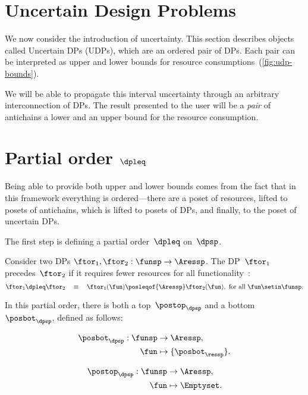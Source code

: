 \section{Uncertain Design Problems}
\label{sec:UDP}

We now consider the introduction of uncertainty.
This section describes
objects called Uncertain DPs (UDPs), which are an ordered pair of
DPs.
Each pair can be interpreted as upper and lower bounds for resource
consumptions~(\cref{fig:udp-bounds}).


We will be able to propagate this interval uncertainty through an
arbitrary interconnection of DPs.
The result presented to the user
will be a \emph{pair} of antichains \textemdash{} a lower and an upper
bound for the resource consumption.

\section{Partial order $\dpleq$}

Being able to provide both upper and lower bounds comes from the fact
that in this framework everything is ordered---there are
a poset of resources, lifted to posets of antichains, which is lifted
to posets of DPs, and finally, to the poset of uncertain DPs.

The first step is defining a partial order~$\dpleq$ on~$\dpsp$.
\begin{definition}
    Consider two DPs $\ftor_{1},\ftor_{2}:\funsp\rightarrow\Aressp$.
    The DP~$\ftor_{1}$ precedes~$\ftor_{2}$ if it requires fewer resources
    for all functionality~\fun:
    \[
        \ftor_{1}\dpleq\ftor_{2}\quad\equiv\quad\ftor_{1}(\fun)\posleqof{\Aressp}\ftor_{2}(\fun),\ \text{for all }\fun\setin\funsp.
    \]
\end{definition}

In this partial order, there is both a top~$\postop_{\dpsp}$ and a
bottom~$\posbot_{\dpsp}$, defined as follows:

\vspace{-5mm}

\begin{minipage}[t]{0.4\columnwidth}
    \begin{align*}
        \posbot_{\dpsp}:\funsp & \rightarrow\Aressp, \\
        \fun                   & \mapsto\{\posbot_{\ressp}\}.
    \end{align*}

\end{minipage}
\begin{minipage}[t]{0.4\columnwidth}
    \begin{align}
        \postop_{\dpsp}:\funsp & \rightarrow\Aressp,\nonumber \\
        \fun                   & \mapsto\Emptyset.\label{eq:top}
    \end{align}

\end{minipage}

